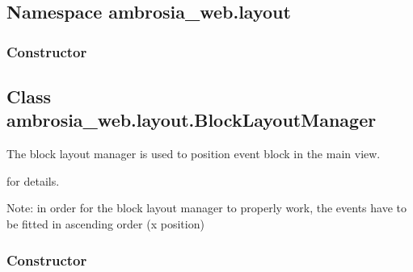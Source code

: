 \documentclass[letterpaper,10pt,english]{sphinxmanual}
\begin{document}
\subsection{Namespace ambrosia\_web.layout}
\label{ambrosia_web.layout:namespace-ambrosia-web-layout}\label{ambrosia_web.layout::doc}

\subsubsection{Constructor}
\label{ambrosia_web.layout:constructor}

\begin{fulllineitems}
\label{ambrosia_web.layout:ambrosia_web.layout}
\end{fulllineitems}



\subsection{Class ambrosia\_web.layout.BlockLayoutManager}
\label{ambrosia_web.layout.BlockLayoutManager:class-ambrosia-web-layout-blocklayoutmanager}\label{ambrosia_web.layout.BlockLayoutManager::doc}
The block layout manager is used to position event block in the main view.




{\hyperref[ambrosia_web.layout.BlockLayoutManager:ambrosia_web.layout.BlockLayoutManager.fitBlock]{}} for details.



Note: in order for the block layout manager to properly work, the events have to be fitted in ascending order (x
position)


\subsubsection{Constructor}
\label{ambrosia_web.layout.BlockLayoutManager:constructor}

\begin{fulllineitems}
\label{ambrosia_web.layout.BlockLayoutManager:ambrosia_web.layout.BlockLayoutManager}
\end{fulllineitems}
\end{document}
